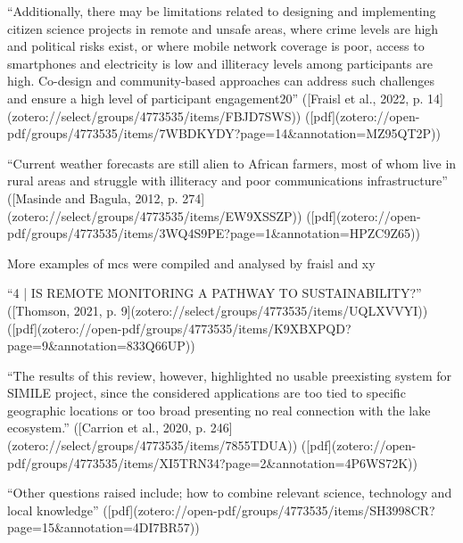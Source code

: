 “Additionally, there may be limitations related to designing and implementing citizen science projects in remote and unsafe areas, where crime levels are high and political risks exist, or where mobile network coverage is poor, access to smartphones and electricity is low and illiteracy levels among participants are high. Co-design and community-based approaches can address such challenges and ensure a high level of participant engagement20” ([Fraisl et al., 2022, p. 14](zotero://select/groups/4773535/items/FBJD7SWS)) ([pdf](zotero://open-pdf/groups/4773535/items/7WBDKYDY?page=14&annotation=MZ95QT2P))

“Current weather forecasts are still alien to African farmers, most of whom live in rural areas and struggle with illiteracy and poor communications infrastructure” ([Masinde and Bagula, 2012, p. 274](zotero://select/groups/4773535/items/EW9XSSZP)) ([pdf](zotero://open-pdf/groups/4773535/items/3WQ4S9PE?page=1&annotation=HPZC9Z65))



More examples of \acrshort*{mcs} were compiled and analysed by fraisl and xy




“4 | IS REMOTE MONITORING A PATHWAY TO SUSTAINABILITY?” ([Thomson, 2021, p. 9](zotero://select/groups/4773535/items/UQLXVVYI)) ([pdf](zotero://open-pdf/groups/4773535/items/K9XBXPQD?page=9&annotation=833Q66UP))

“The results of this review, however, highlighted no usable preexisting system for SIMILE project, since the considered applications are too tied to specific geographic locations or too broad presenting no real connection with the lake ecosystem.” ([Carrion et al., 2020, p. 246](zotero://select/groups/4773535/items/7855TDUA)) ([pdf](zotero://open-pdf/groups/4773535/items/XI5TRN34?page=2&annotation=4P6WS72K))

“Other questions raised include; how to combine relevant science, technology and local knowledge” ([pdf](zotero://open-pdf/groups/4773535/items/SH3998CR?page=15&annotation=4DI7BR57))




